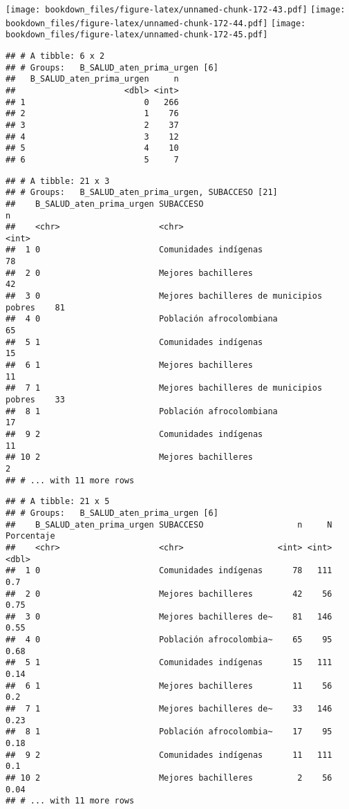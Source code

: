 \documentclass[]{article}
\theoremstyle{definition}
\theoremstyle{definition}
\theoremstyle{definition}
\theoremstyle{remark}
\begin{document}
\texttt{[image: bookdown\_files/figure-latex/unnamed-chunk-172-43.pdf]}
\texttt{[image: bookdown\_files/figure-latex/unnamed-chunk-172-44.pdf]}
\texttt{[image: bookdown\_files/figure-latex/unnamed-chunk-172-45.pdf]}

\begin{verbatim}
## # A tibble: 6 x 2
## # Groups:   B_SALUD_aten_prima_urgen [6]
##   B_SALUD_aten_prima_urgen     n
##                      <dbl> <int>
## 1                        0   266
## 2                        1    76
## 3                        2    37
## 4                        3    12
## 5                        4    10
## 6                        5     7
\end{verbatim}

\begin{verbatim}
## # A tibble: 21 x 3
## # Groups:   B_SALUD_aten_prima_urgen, SUBACCESO [21]
##    B_SALUD_aten_prima_urgen SUBACCESO                                    n
##    <chr>                    <chr>                                    <int>
##  1 0                        Comunidades indígenas                       78
##  2 0                        Mejores bachilleres                         42
##  3 0                        Mejores bachilleres de municipios pobres    81
##  4 0                        Población afrocolombiana                    65
##  5 1                        Comunidades indígenas                       15
##  6 1                        Mejores bachilleres                         11
##  7 1                        Mejores bachilleres de municipios pobres    33
##  8 1                        Población afrocolombiana                    17
##  9 2                        Comunidades indígenas                       11
## 10 2                        Mejores bachilleres                          2
## # ... with 11 more rows
\end{verbatim}

\begin{verbatim}
## # A tibble: 21 x 5
## # Groups:   B_SALUD_aten_prima_urgen [6]
##    B_SALUD_aten_prima_urgen SUBACCESO                   n     N Porcentaje
##    <chr>                    <chr>                   <int> <int>      <dbl>
##  1 0                        Comunidades indígenas      78   111       0.7 
##  2 0                        Mejores bachilleres        42    56       0.75
##  3 0                        Mejores bachilleres de~    81   146       0.55
##  4 0                        Población afrocolombia~    65    95       0.68
##  5 1                        Comunidades indígenas      15   111       0.14
##  6 1                        Mejores bachilleres        11    56       0.2 
##  7 1                        Mejores bachilleres de~    33   146       0.23
##  8 1                        Población afrocolombia~    17    95       0.18
##  9 2                        Comunidades indígenas      11   111       0.1 
## 10 2                        Mejores bachilleres         2    56       0.04
## # ... with 11 more rows
\end{verbatim}
\end{document}
